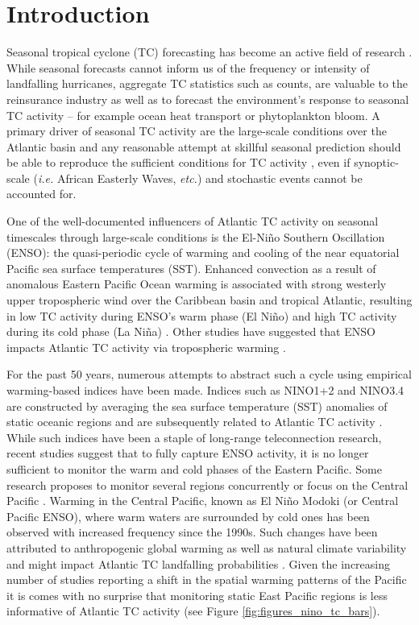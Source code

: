 \section{Introduction}
Seasonal tropical cyclone (TC) forecasting has become an active field of research \cite{elsner1993, elsner1998, elsner2008, klotzbach2009}. While seasonal forecasts cannot inform us of the frequency or intensity of landfalling hurricanes, aggregate TC statistics such as counts, are valuable to the reinsurance industry as well as to forecast the environment's response to seasonal TC activity -- for example ocean heat transport or phytoplankton bloom. A primary driver of seasonal TC activity are the large-scale conditions over the Atlantic basin and any reasonable attempt at skillful seasonal prediction should be able to reproduce the sufficient conditions for TC activity \cite{gray1968}, even if synoptic-scale (\emph{i.e.} African Easterly Waves, \emph{etc.}) and stochastic events cannot be accounted for.

One of the well-documented influencers of Atlantic TC activity on seasonal timescales through large-scale conditions is the El-Ni\~no Southern Oscillation (ENSO): the quasi-periodic cycle of warming and cooling of the near equatorial Pacific sea surface temperatures (SST). Enhanced convection as a result of anomalous Eastern Pacific Ocean warming is associated with strong westerly upper tropospheric wind over the Caribbean basin and tropical Atlantic, resulting in low TC activity during ENSO's warm phase (El Ni\~no) and high TC activity during its cold phase (La Ni\~na) \cite{gray1984a}. Other studies have suggested that ENSO impacts Atlantic TC activity via tropospheric warming \cite{tang2004}.

For the past 50 years, numerous attempts to abstract such a cycle using empirical warming-based indices have been made. Indices such as NINO1+2 and NINO3.4 are constructed by averaging the sea surface temperature (SST) anomalies of static oceanic regions and are subsequently related to Atlantic TC activity \cite{trenberth1997definition}. While such indices have been a staple of long-range teleconnection research, recent studies suggest that to fully capture ENSO activity, it is no longer sufficient to monitor the warm and cold phases of the Eastern Pacific. Some research proposes to monitor several regions concurrently \cite{trenberth2001,ren2011} or focus on the Central Pacific \cite{ashok2007}. Warming in the Central Pacific, known as El Ni\~no Modoki (or Central Pacific ENSO), where warm waters are surrounded by cold ones has been observed with increased frequency since the 1990s. Such changes have been attributed to anthropogenic global warming \cite{yeh2009} as well as natural climate variability \cite{wittenberg2009} and might impact Atlantic TC landfalling probabilities \cite{kim2009}. Given the increasing number of studies reporting a shift in the spatial warming patterns of the Pacific it is comes with no surprise that monitoring static East Pacific regions is less informative of Atlantic TC activity (see Figure \ref{fig:figures_nino_tc_bars}). 


